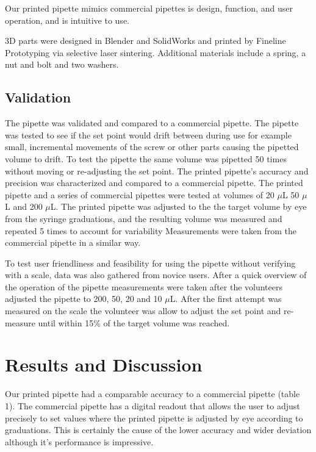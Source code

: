 Our printed pipette mimics commercial pipettes is design, function, and user operation, and is intuitive to use.

3D parts were designed in Blender and SolidWorks and printed by Fineline Prototyping via selective laser sintering. 
Additional materials include a spring, a nut and bolt and two washers.

\subsection*{Validation}

The pipette was validated and compared to a commercial pipette. 
The pipette was tested to see if the set point would drift between during use for example small, incremental movements of the screw or other parts causing the pipetted volume to drift.
To test the pipette the same volume was pipetted 50 times without moving or re-adjusting the set point. 
The printed pipette's accuracy and precision was characterized and compared to a commercial pipette.
The printed pipette and a series of commercial pipettes were tested at volumes of 20 $\mu$L 50 $\mu$L and 200 $\mu$L.
The printed pipette was adjusted to the the target volume by eye from the syringe graduations, and the resulting volume was measured and repeated 5 times to account for variability
Measurements were taken from the commercial pipette in a similar way. 

To test user friendliness and feasibility for using the pipette without verifying with a scale, data was also gathered from novice users.
After a quick overview of the operation of the pipette measurements were taken after the volunteers adjusted the pipette to 200, 50, 20 and 10 $\mu$L.
After the first attempt was measured on the scale the volunteer was allow to adjust the set point and re-measure until within 15\% of the target volume was reached.

\section*{Results and Discussion}

Our printed pipette had a comparable accuracy to a commercial pipette (table 1).
The commercial pipette has a digital readout that allows the user to adjust precisely to set values where the printed pipette is adjusted by eye according to graduations.
This is certainly the cause of the lower accuracy and wider deviation although it's performance is impressive. 

